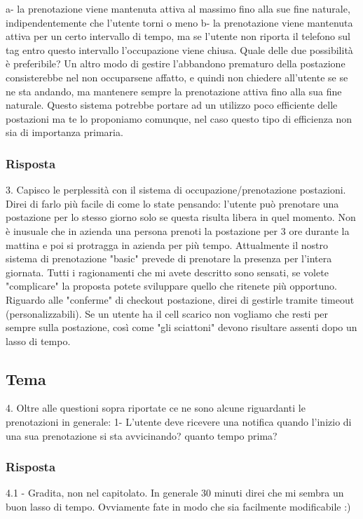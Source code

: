 a- la prenotazione viene mantenuta attiva al massimo fino alla sue fine naturale, indipendentemente che l'utente torni o meno
b- la prenotazione viene mantenuta attiva per un certo intervallo di tempo, ma se l'utente non riporta il telefono sul tag entro questo intervallo l'occupazione viene chiusa.
Quale delle due possibilità è preferibile?
Un altro modo di gestire l'abbandono prematuro della postazione consisterebbe nel non occuparsene affatto, e quindi non chiedere all'utente se se ne sta andando, ma mantenere sempre la prenotazione attiva fino alla sua fine naturale. Questo sistema potrebbe portare ad un utilizzo poco efficiente delle postazioni ma te lo proponiamo comunque, nel caso questo tipo di efficienza non sia di importanza primaria.
\subsubsection*{Risposta}
3. Capisco le perplessità con il sistema di occupazione/prenotazione postazioni. Direi di farlo più facile di come lo state pensando: l'utente può prenotare una postazione per lo stesso giorno solo se questa risulta libera in quel momento. Non è inusuale che in azienda una persona prenoti la postazione per 3 ore durante la mattina e poi si protragga in azienda per più tempo. Attualmente il nostro sistema di prenotazione "basic" prevede di prenotare la presenza per l'intera giornata. Tutti i ragionamenti che mi avete descritto sono sensati, se volete "complicare" la proposta potete sviluppare quello che ritenete più opportuno. Riguardo alle "conferme" di checkout postazione, direi di gestirle tramite timeout (personalizzabili). Se un utente ha il cell scarico non vogliamo che resti per sempre sulla postazione, così come "gli sciattoni" devono risultare assenti dopo un lasso di tempo.

\subsection*{Tema}
4. Oltre alle questioni sopra riportate ce ne sono alcune riguardanti le prenotazioni in generale:
1- L'utente deve ricevere una notifica quando l'inizio di una sua prenotazione si sta avvicinando? quanto tempo prima?
\subsubsection*{Risposta}
4.1 - Gradita, non nel capitolato. In generale 30 minuti direi che mi sembra un buon lasso di tempo. Ovviamente fate in modo che sia facilmente modificabile :)

